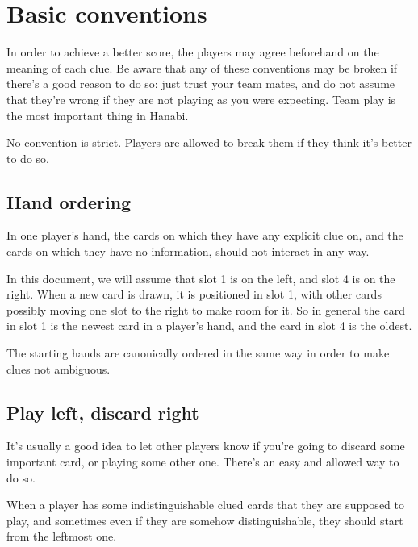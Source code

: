 \section{Basic conventions}

In order to achieve a better score, the players may agree beforehand on the meaning of each clue. Be aware that any of these conventions may be broken if there's a good reason to do so: just trust your team mates, and do not assume that they're wrong if they are not playing as you were expecting. Team play is the most important thing in Hanabi.

\begin{remark}
	No convention is strict. Players are allowed to break them if they think it's better to do so.
\end{remark}

\subsection{Hand ordering}

In one player's hand, the cards on which they have any explicit clue on, and the cards on which they have no information, should not interact in any way.

In this document, we will assume that slot 1 is on the left, and slot 4 is on the right. When a new card is drawn, it is positioned in slot 1, with other cards possibly moving one slot to the right to make room for it. So in general the card in slot 1 is the newest card in a player's hand, and the card in slot 4 is the oldest.

The starting hands are canonically ordered in the same way in order to make clues not ambiguous.

\subsection{Play left, discard right}

It's usually a good idea to let other players know if you're going to discard some important card, or playing some other one. There's an easy and allowed way to do so.

\begin{convention}
	\label{play-left}
	When a player has some indistinguishable clued cards that they are supposed to play, and sometimes even if they are somehow distinguishable, they should start from the leftmost one.
\end{convention}

